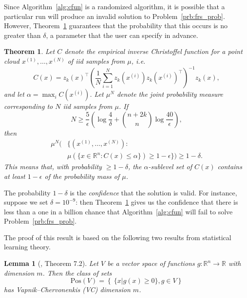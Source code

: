 \documentclass[letterpaper, 10 pt, conference]{ieeeconf}
\newcommand{\R}{\mathbb{R}}
\newtheorem{lemma}{Lemma}
\newtheorem{theorem}{Theorem}
\begin{document}
Since Algorithm~\ref{alg:cfun} is a randomized algorithm, it is possible that a particular run will produce an invalid solution to Problem~\ref{prb:frs_prob}. However, Theorem~\ref{thm:cfun_pac} guarantees that the probability that this occurs is no greater than $\delta$, a parameter that the user can specify in advance.

\begin{theorem}
    \label{thm:cfun_pac}
    Let $C$ denote the empirical inverse Christoffel function for a point
    cloud $x^{(1)},\dotsc,x^{(N)}$ of iid samples from $\mu$, i.e.
    \begin{equation*}
        C(x)=z_k(x)^\top\left(\frac{1}{N}\sum_{i=1}^N z_k(x^{(i)})z_k(x^{(i)})^\top\right)^{-1}z_k(x),
    \end{equation*}
    and let $\alpha = \max_i C(x^{(i)})$.
    Let $\mu^N$ denote the joint probability measure corresponding to $N$ iid samples from $\mu$.
    If
    \begin{equation}
        \label{eq:cfun_pac_bound}
        N \ge 
            \frac{5}{\epsilon}\left(
            \log\frac{4}{\delta} + \binom{n+2k}{n} \log\frac{40}{\epsilon}
        \right),
    \end{equation}
    then
    \begin{equation}
    \begin{aligned}
    \mu^N\bigg(&\{(x^{(1)},\dotsc,x^{(N)}):\\ 
    &\mu\left(\{x\in\R^n : C(x) \le \alpha\}\right) \ge 1-\epsilon\}\bigg) \ge 1-\delta.
    \end{aligned}
    \end{equation}
    This means that, with probability $\ge 1-\delta$, the
    $\alpha$-sublevel set of $C(x)$ contains at least $1-\epsilon$ of the
    probability mass of $\mu$.
\end{theorem}
The probability $1-\delta$ is the \emph{confidence} that the solution is valid. For instance, suppose we set $\delta=10^{-9}$: then Theorem~\ref{thm:cfun_pac} gives us the confidence that there is less than a one in a billion chance that Algorithm~\ref{alg:cfun} will fail to solve Problem~\ref{prb:frs_prob}.

The proof of this result is based on the following two results from statistical
learning theory. 

\begin{lemma}[\cite{dudley1978central}, Theorem 7.2]
    \label{lem:pos_vc}
    Let $V$ be a vector space of functions $g:\R^n\to\R$ with dimension $m$.
    Then the class of sets
    \begin{equation*}
        \text{Pos}(V) = \left\{\ \{x | g(x)\ge 0\}, g\in V\right\}
    \end{equation*}
    has Vapnik–Chervonenkis (VC) dimension $m$.
\end{lemma}
\end{document}
